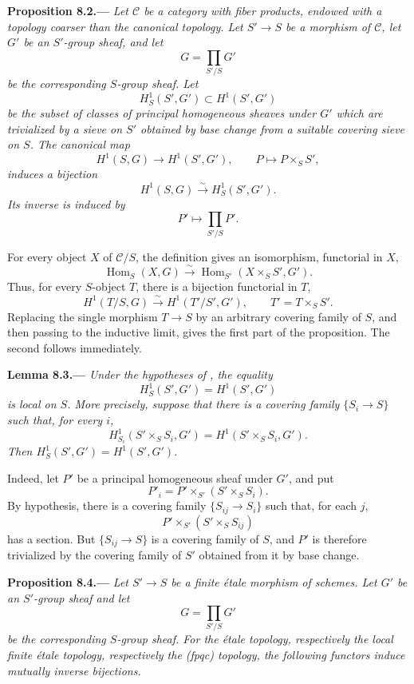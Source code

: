 \par\medskip\noindent{}\textbf{Proposition 8.2.---}\enspace
\emph{Let \(\mathcal C\) be a category with fiber products, endowed
with a topology coarser than the canonical topology. Let \(S'\to S\)
be a morphism of \(\mathcal C\), let \(G'\) be an \(S'\)-group sheaf,
and let
\[
  G=\prod_{S'/S}G'
\]
be the corresponding \(S\)-group sheaf. Let
\[
  H^1_S(S',G')\subset H^1(S',G')
\]
be the subset of classes of principal homogeneous sheaves under
\(G'\) which are trivialized by a sieve on \(S'\) obtained by base
change from a suitable covering sieve on \(S\). The canonical map
\[
  H^1(S,G)\longrightarrow H^1(S',G'),
  \qquad
  P\longmapsto P\times_SS',
\]
induces a bijection
\[
  H^1(S,G)\xrightarrow{\sim}H^1_S(S',G').
\]
Its inverse is induced by
\[
  P'\longmapsto\prod_{S'/S}P'.
\]}

For every object \(X\) of \(\mathcal C/S\), the definition gives an
isomorphism, functorial in \(X\),
\[
  \operatorname{Hom}_S(X,G)
  \xrightarrow{\sim}
  \operatorname{Hom}_{S'}(X\times_SS',G').
\]
Thus, for every \(S\)-object \(T\), there is a bijection functorial in
\(T\),
\[
  H^1(T/S,G)
  \xrightarrow{\sim}
  H^1(T'/S',G'),
  \qquad
  T'=T\times_SS'.
\]
Replacing the single morphism \(T\to S\) by an arbitrary covering
family of \(S\), and then passing to the inductive limit, gives the
first part of the proposition. The second follows immediately.

\par\medskip\noindent{}\textbf{Lemma 8.3.---}\enspace
\emph{Under the hypotheses of , the equality
\[
  H^1_S(S',G')=H^1(S',G')
\]
is local on \(S\). More precisely, suppose that there is a covering
family \(\{S_i\to S\}\) such that, for every \(i\),
\[
  H^1_{S_i}(S'\times_SS_i,G')
  =
  H^1(S'\times_SS_i,G').
\]
Then \(H^1_S(S',G')=H^1(S',G')\).}

Indeed, let \(P'\) be a principal homogeneous sheaf under \(G'\), and
put
\[
  P'_i=P'\times_{S'}(S'\times_SS_i).
\]
By hypothesis, there is a covering family
\(\{S_{ij}\to S_i\}\) such that, for each \(j\),
\[
  P'\times_{S'}(S'\times_SS_{ij})
\]
has a section. But \(\{S_{ij}\to S\}\) is a covering family of \(S\),
and \(P'\) is therefore trivialized by the covering family of \(S'\)
obtained from it by base change.

\par\medskip\noindent{}\textbf{Proposition 8.4.---}\enspace
\emph{Let \(S'\to S\) be a finite étale morphism of schemes. Let
\(G'\) be an \(S'\)-group sheaf and let
\[
  G=\prod_{S'/S}G'
\]
be the corresponding \(S\)-group sheaf. For the étale topology,
respectively the local finite étale topology, respectively the
\textup{(fpqc)} topology, the following functors induce mutually
inverse bijections.}

